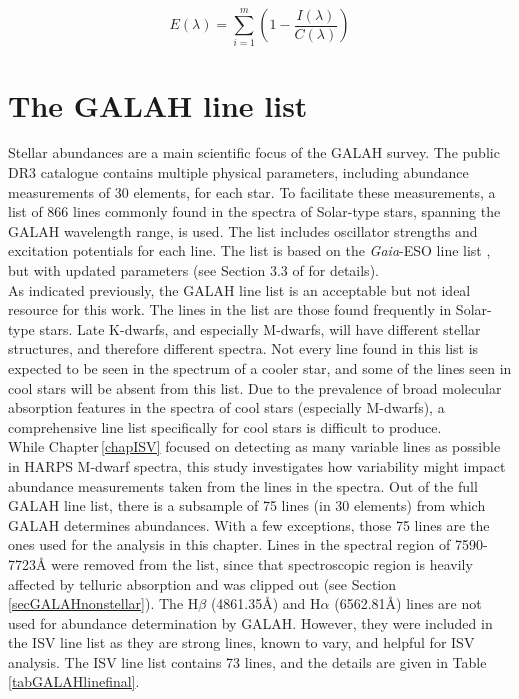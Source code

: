 \begin{equation}
    E(\lambda) = \sum\limits_{i=1}^m \left( 1-\frac{I(\lambda)}{C(\lambda)} \right)
    \label{eqGALAHew}
\end{equation}

\section{The GALAH line list}
\label{secGALAHlinelist}
Stellar abundances are a main scientific focus of the GALAH survey. The public DR3 catalogue contains multiple physical parameters, including abundance measurements of 30 elements, for each star. To facilitate these measurements, a list of 866 lines commonly found in the spectra of Solar-type stars, spanning the GALAH wavelength range, is used. The list includes oscillator strengths and excitation potentials for each line. The list is based on the {\em Gaia}-ESO line list \citep{2015Heiter}, but with updated parameters (see Section 3.3 of \citealt{2021Buder} for details).\\

As indicated previously, the GALAH line list is an acceptable but not ideal resource for this work. The lines in the list are those found frequently in Solar-type stars. Late K-dwarfs, and especially M-dwarfs, will have different stellar structures, and therefore different spectra. Not every line found in this list is expected to be seen in the spectrum of a cooler star, and some of the lines seen in cool stars will be absent from this list. Due to the prevalence of broad molecular absorption features in the spectra of cool stars (especially M-dwarfs), a comprehensive line list specifically for cool stars is difficult to produce.\\

While Chapter\,\ref{chapISV} focused on detecting as many variable lines as possible in HARPS M-dwarf spectra, this study investigates how variability might impact abundance measurements taken from the lines in the spectra. Out of the full GALAH line list, there is a subsample of 75 lines (in 30 elements) from which GALAH determines abundances. With a few exceptions, those 75 lines are the ones used for the analysis in this chapter. Lines in the spectral region of 7590-7723\hbox{\AA} were removed from the list, since that spectroscopic region is heavily affected by telluric absorption and was clipped out (see Section\,\ref{secGALAHnonstellar}). The H$\beta$ (4861.35\hbox{\AA}) and H$\alpha$ (6562.81\hbox{\AA}) lines are not used for abundance determination by GALAH. However, they were included in the ISV line list as they are strong lines, known to vary, and helpful for ISV analysis. The ISV line list contains 73 lines, and the details are given in Table\,\ref{tabGALAHlinefinal}.\\

